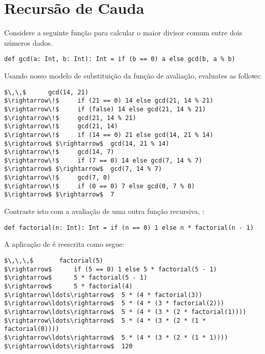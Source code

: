 \section{Recurs\~{a}o de Cauda}

Considere a seguinte fun\c{c}\~{a}o para calcular o maior divisor comum entre
dois n\'{u}meros dados.

\begin{lstlisting}
def gcd(a: Int, b: Int): Int = if (b == 0) a else gcd(b, a % b)
\end{lstlisting}

Usando nosso modelo de substitui\c{c}\~{a}o da fun\c{c}\~{a}o de avalia\c{c}\~{a}o,
 evaluates as follows:

\begin{lstlisting}
$\,\,$      gcd(14, 21)  
$\rightarrow\!$     if (21 == 0) 14 else gcd(21, 14 % 21)
$\rightarrow\!$     if (false) 14 else gcd(21, 14 % 21)
$\rightarrow\!$     gcd(21, 14 % 21)
$\rightarrow\!$     gcd(21, 14)
$\rightarrow\!$     if (14 == 0) 21 else gcd(14, 21 % 14)
$\rightarrow$ $\rightarrow$  gcd(14, 21 % 14)
$\rightarrow\!$     gcd(14, 7)
$\rightarrow\!$     if (7 == 0) 14 else gcd(7, 14 % 7)
$\rightarrow$ $\rightarrow$  gcd(7, 14 % 7)
$\rightarrow\!$     gcd(7, 0)
$\rightarrow\!$     if (0 == 0) 7 else gcd(0, 7 % 0)
$\rightarrow$ $\rightarrow$  7
\end{lstlisting}


Contraste isto com a avalia\c{c}\~{a}o de uma outra fun\c{c}\~{a}o recursiva,
:

\begin{lstlisting}
def factorial(n: Int): Int = if (n == 0) 1 else n * factorial(n - 1)
\end{lstlisting}

A aplica\c{c}\~{a}o de  \'{e} reescrita como segue: 

\begin{lstlisting}
$\,\,\,$       factorial(5)
$\rightarrow$      if (5 == 0) 1 else 5 * factorial(5 - 1)
$\rightarrow$      5 * factorial(5 - 1)
$\rightarrow$      5 * factorial(4)
$\rightarrow\ldots\rightarrow$  5 * (4 * factorial(3))
$\rightarrow\ldots\rightarrow$  5 * (4 * (3 * factorial(2)))
$\rightarrow\ldots\rightarrow$  5 * (4 * (3 * (2 * factorial(1))))
$\rightarrow\ldots\rightarrow$  5 * (4 * (3 * (2 * (1 * factorial(0))))
$\rightarrow\ldots\rightarrow$  5 * (4 * (3 * (2 * (1 * 1))))
$\rightarrow\ldots\rightarrow$  120
\end{lstlisting}

